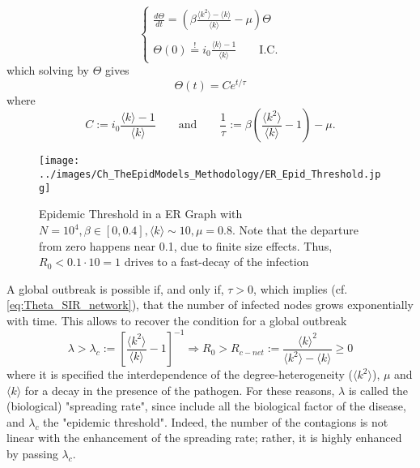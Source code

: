 \documentclass[a4paper,10pt,twoside]{book} %
\theoremstyle{definition}
\begin{document}
\begin{equation}
	\begin{cases}
		\frac{d\Theta}{dt} = \left( \beta\frac{\langle k^2 \rangle - \langle k \rangle}{\langle k \rangle} - \mu \right) \Theta \\ \\
		\Theta(0) \stackrel{!}{=} i_0 \frac{\langle k \rangle -1}{\langle k \rangle } \qquad \text{I.C.}
	\end{cases}
\end{equation}
which solving by $\Theta$ gives 
\begin{equation}
	\Theta(t) = C e^{t/\tau}
	\label{eq:Theta_SIR_network}
\end{equation} 
where
\begin{equation}
	C := i_0\frac{\langle k \rangle -1}{\langle k \rangle}  \qquad \text{and} \qquad
	\frac{1}{\tau} := \beta \left(\frac{\langle k^2 \rangle}{\langle k \rangle}-1\right)
	-\mu.
	\label{eq:tau_SIR_networks}
\end{equation}

\begin{figure}[t]
	\texttt{[image: ../images/Ch\_TheEpidModels\_Methodology/ER\_Epid\_Threshold.jpg]}
	\centering
	\caption{Epidemic Threshold in a ER Graph with $N = 10^{4}, \beta \in [0,0.4], \langle k \rangle \sim 10, \mu = 0.8$. Note that the departure from zero happens near 0.1, due to finite size effects. Thus, $R_0 < 0.1 \cdot 10 = 1$ drives to a fast-decay of the infection}
	\label{fig:ER_Epidem_Thr}
\end{figure}

A global outbreak is possible if, and only if, $\tau > 0$, which implies (cf. \autoref{eq:Theta_SIR_network}), that the number of infected nodes grows exponentially with time. This allows to recover the condition for a global outbreak
\begin{equation}
	\lambda > 
	\lambda_c:=\left[ \frac{\langle k^2 \rangle}{\langle k \rangle} - 1\right]^{-1}
	\Rightarrow
	R_0 > R_{c-net}:=\frac{ \langle k \rangle^2 }{\langle k^2 \rangle-\langle k \rangle} \geq 0
	\label{eq:lambdac_Rc_netSIR}
\end{equation}
where it is specified the interdependence of the degree-heterogeneity ($\langle k^2 \rangle$), $\mu$ and $\langle k \rangle$ for a decay in the presence of the pathogen. For these reasons, $\lambda$ is called the (biological) "spreading rate", since include all the biological factor of the disease, and $\lambda_c$ the "epidemic threshold". Indeed, the number of the contagions is not linear with the enhancement of the spreading rate; rather, it is highly enhanced by passing $\lambda_c$. 
\end{document}

